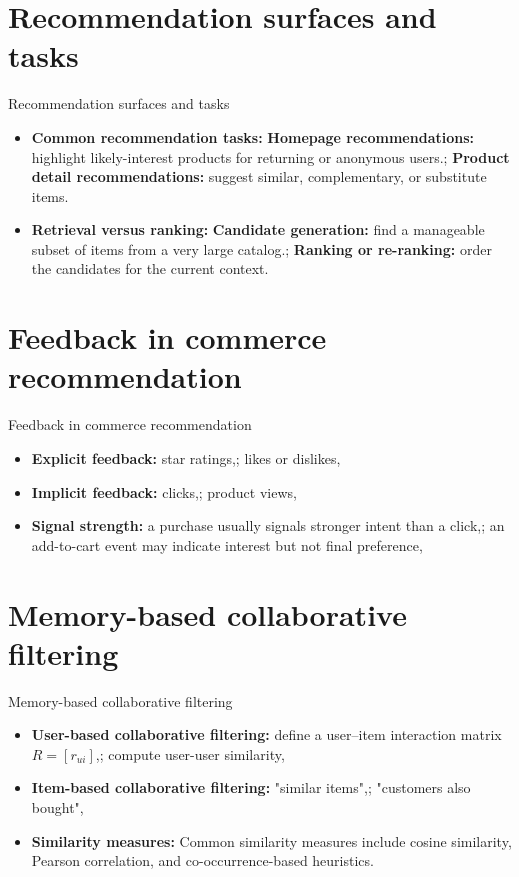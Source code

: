\documentclass[aspectratio=169]{beamer}
\begin{document}
\section{Recommendation surfaces and tasks}

\begin{frame}{Recommendation surfaces and tasks}
  \begin{itemize}
    \item \textbf{Common recommendation tasks:} \textbf{Homepage recommendations:} highlight likely-interest products for returning or anonymous users.; \textbf{Product detail recommendations:} suggest similar, complementary, or substitute items.
    \item \textbf{Retrieval versus ranking:} \textbf{Candidate generation:} find a manageable subset of items from a very large catalog.; \textbf{Ranking or re-ranking:} order the candidates for the current context.
  \end{itemize}
\end{frame}

\section{Feedback in commerce recommendation}

\begin{frame}{Feedback in commerce recommendation}
  \begin{itemize}
    \item \textbf{Explicit feedback:} star ratings,; likes or dislikes,
    \item \textbf{Implicit feedback:} clicks,; product views,
    \item \textbf{Signal strength:} a purchase usually signals stronger intent than a click,; an add-to-cart event may indicate interest but not final preference,
  \end{itemize}
\end{frame}

\section{Memory-based collaborative filtering}

\begin{frame}{Memory-based collaborative filtering}
  \begin{itemize}
    \item \textbf{User-based collaborative filtering:} define a user--item interaction matrix $R=[r_{ui}]$,; compute user-user similarity,
    \item \textbf{Item-based collaborative filtering:} "similar items",; "customers also bought",
    \item \textbf{Similarity measures:} Common similarity measures include cosine similarity, Pearson correlation, and co-occurrence-based heuristics.
  \end{itemize}
\end{frame}
\end{document}
